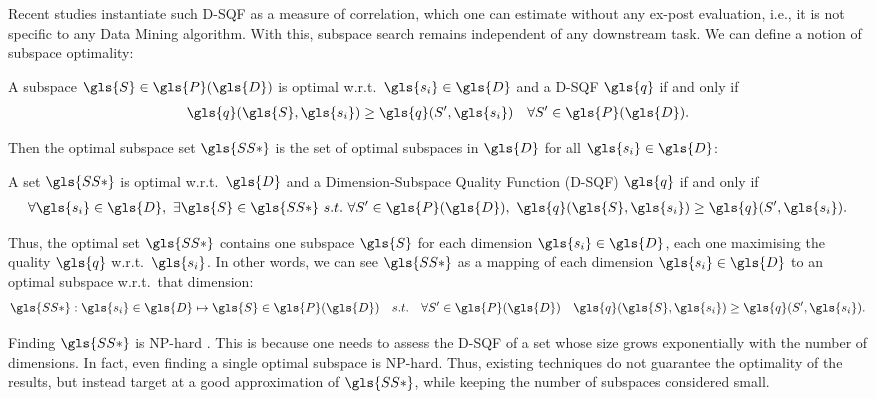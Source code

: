 Recent studies \cite{DBLP:conf/aaai/WangRNBMX17, DBLP:journals/ijdsa/TrittenbachB19} instantiate such \gls{D-SQF} as a measure of correlation, which one can estimate without any ex-post evaluation, i.e., it is not specific to any Data Mining algorithm. With this, subspace search remains independent of any downstream task. 
We can define a notion of subspace optimality: 
\begin{definition}
	A subspace $ \gls{S} \in   \gls{P}( \gls{D})$ is optimal w.r.t.\ $ \gls{s_i} \in  \gls{D}$ and a \gls{D-SQF} $\gls{q}$ if and only if 
	\begin{align*}
	\gls{q}( \gls{S},  \gls{s_i}) \geq  \gls{q}(S',  \gls{s_i}) \quad \forall S' \in  \gls{P}( \gls{D}).
	\end{align*}
\end{definition}
Then the optimal subspace set $\gls{SS*}$ is the set of optimal subspaces in $\gls{D}$ for all $\gls{s_i} \in \gls{D}$:
\begin{definition} \label{def:optimalset} A set $\gls{SS*}$ is optimal w.r.t.\ $\gls{D}$ and a Dimension-Subspace Quality Function (\gls{D-SQF}) $ \gls{q}$ if and only if
	\begin{align*}
	\forall \gls{s_i} \in \gls{D},~ \exists \gls{S} \in \gls{SS*} ~s.t.~ \forall S' \in \gls{P}(\gls{D}),~ \gls{q}(\gls{S},\gls{s_i}) \geq \gls{q}(S',\gls{s_i}).
	\end{align*}
\end{definition}
Thus, the optimal set $\gls{SS*}$ contains one subspace $\gls{S}$ for each dimension $ \gls{s_i} \in \gls{D}$, each one maximising the quality $ \gls{q}$ w.r.t.\ $ \gls{s_i}$. 
In other words, we can see $\gls{SS*}$ as a mapping of each dimension $ \gls{s_i} \in \gls{D}$ to an optimal subspace w.r.t.\ that dimension: 
\begin{align*}
\gls{SS*}:  \gls{s_i} \in  \gls{D} \mapsto  \gls{S} \in   \gls{P}(\gls{D}) \quad s.t. \quad \forall S' \in   \gls{P}(\gls{D}) \quad  \gls{q}(\gls{S}, \gls{s_i}) \geq  \gls{q}(S', \gls{s_i}).
\end{align*}

Finding $\gls{SS*}$ is NP-hard \cite{DBLP:phd/dnb/Nguyen15d}. 
This is because one needs to assess the \gls{D-SQF} of a set whose size grows exponentially with the number of dimensions. In fact, even finding a single optimal subspace is NP-hard. Thus, existing techniques do not guarantee the optimality of the results, but instead target at a good approximation of $\gls{SS*}$, while keeping the number of subspaces considered small. 

